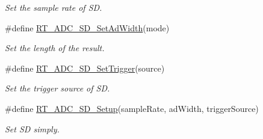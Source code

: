 \begin{DoxyCompactItemize}
\begin{DoxyCompactList}\small\item\em Set the sample rate of SD. \end{DoxyCompactList}\item 
\#define \mbox{\hyperlink{a00002_acb989d89893ac99af984979cb9e8df2a}{R\+T\+\_\+\+A\+D\+C\+\_\+\+S\+D\+\_\+\+Set\+Ad\+Width}}(mode)
\begin{DoxyCompactList}\small\item\em Set the length of the result. \end{DoxyCompactList}\item 
\#define \mbox{\hyperlink{a00002_a11bf38478bd196acd1f179115e714dfc}{R\+T\+\_\+\+A\+D\+C\+\_\+\+S\+D\+\_\+\+Set\+Trigger}}(source)
\begin{DoxyCompactList}\small\item\em Set the trigger source of SD. \end{DoxyCompactList}\item 
\#define \mbox{\hyperlink{a00002_a312f152517ab50c1cda791e118dd4473}{R\+T\+\_\+\+A\+D\+C\+\_\+\+S\+D\+\_\+\+Setup}}(sample\+Rate,  ad\+Width,  trigger\+Source)
\begin{DoxyCompactList}\small\item\em Set SD simply. \end{DoxyCompactList}\end{DoxyCompactItemize}
